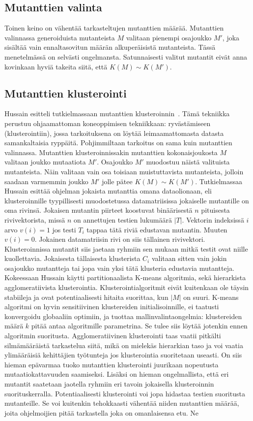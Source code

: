 \documentclass{tktltiki}
\begin{document}
\subsection{Mutanttien valinta}
Toinen keino on vähentää tarkasteltujen mutanttien määrää. Mutanttien valinnassa generoiduista mutanteista $M$ valitaan pienempi osajoukko $M'$, joka sisältää vain ennaltasovitun määrän alkuperäisistä mutanteista. Tässä menetelmässä on selvästi ongelmansta. Satunnaisesti valitut mutantit eivät anna kovinkaan hyviä takeita siitä, että $K(M) \sim K(M')$. 

\subsection{Mutanttien klusterointi}
Hussain esitteli tutkielmassaan mutanttien klusteroinnin~\cite{Hussain08}. Tämä tekniikka perustuu ohjaamattoman koneoppimisen tekniikkaan: ryvästämiseen (klusterointiin), jossa tarkoituksena on löytää leimaamattomasta datasta samankaltaisia ryppäitä. Pohjimmiltaan tarkoitus on sama kuin mutanttien valinnassa. Mutanttien klusteroinnissakin mutanttien kokonaisjoukosta $M$ valitaan joukko mutaatiota $M'$. Osajoukko $M'$ muodostuu näistä valituista mutanteista. Näin valitaan vain osa toisiaan muistuttavista mutanteista, jolloin saadaan varmemmin joukko $M'$ jolle pätee $K(M) \sim K(M')$. Tutkielmassaa Hussain esittää ohjelman jokaista mutanttia omana dataolionaan, eli klusteroinnille tyypillisesti muodostetussa datamatriisissa jokaiselle mutantille on oma rivinsä. Jokaisen mutantin piirteet koostuvat binäärisestä $n$ pituisesta rivivektorista, missä $n$ on annettujen testien lukumäärä $|T|$. Vektorin indeksissä $i$ arvo $v(i) = 1$ jos testi $T_i$ tappaa tätä riviä edustavan mutantin. Muuten $v(i) = 0$. Jokainen datamatriisin rivi on siis tällainen rivivektori. Klusteroinnissa mutantit siis jaetaan ryhmiin sen mukaan mitkä testit ovat niille kuollettavia. Jokaisesta tällaisesta klusterista $C_{i}$ valitaan sitten vain jokin osajoukko mutantteja tai jopa vain yksi tätä klusteria edustavia mutantteja. Kokeessaan Hussain käytti partitionaalista K-means algoritmia, sekä hierarkista agglomeratiivista klusterointia. Klusterointialgoritmit eivät kuitenkaan ole täysin stabiileja ja ovat potentiaalisesti hitaita suorittaa, kun $|M|$ on suuri. K-means algoritmi on hyvin sensitiivinen klustereiden initialisoinnille, ei taatusti konvergoidu globaaliin optimiin, ja tuottaa mallinvalintaongelmia: klustereiden määrä $k$ pitää antaa algoritmille parametrina. Se tulee siis löytää jotenkin ennen algoritmin suoritusta. Agglomeratiivinen klusterointi taas vaatii pitkälti silmämääräistä tarkastelua siitä, mikä on mielekäs hierarkian taso ja voi vaatia ylimääräisiä kehittäjien työtunteja jos klusterointia suoritetaan useasti. On siis hieman epävarmaa tuoko mutanttien klusterointi juurikaan nopeutusta mutaatiokattavuuden saamiseksi. Lisäksi on hieman ongelmallista, että eri mutantit saatetaan jaotella ryhmiin eri tavoin jokaisella klusteroinnin suorituskerralla. Potentiaalisesti klusterointi voi jopa hidastaa testien suoritusta mutanteille. Se voi kuitenkin tehokkaasti vähentää niiden mutanttien määrää, joita ohjelmoijien pitää tarkastella joka on omanlaisensa etu. Ne 
\end{document}

